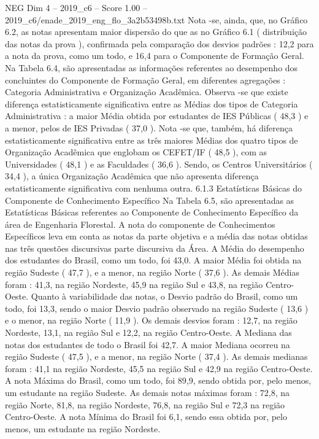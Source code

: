 \begin{textsample}{NEG Dim 4 – 2019\_c6 – Score 1.00 – 2019\_c6/enade\_2019\_eng\_flo\_3a2b53498b.txt}
Nota -se, ainda, que, no Gráfico 6.2, as notas apresentam maior dispersão do que as no Gráfico 6.1 ( distribuição das notas da prova ), confirmada pela comparação dos desvios padrões : 12,2 para a nota da prova, como um todo, e 16,4 para o Componente de Formação Geral.
Na Tabela 6.4, são apresentadas as informações referentes ao desempenho dos concluintes do Componente de Formação Geral, em diferentes agregações : Categoria Administrativa e Organização Acadêmica.
Observa -se que existe diferença estatisticamente significativa entre as Médias dos tipos de Categoria Administrativa : a maior Média obtida por estudantes de IES Públicas ( 48,3 ) e a menor, pelos de IES Privadas ( 37,0 ).
Nota -se que, também, há diferença estatisticamente significativa entre as três maiores Médias dos quatro tipos de Organização Acadêmica que englobam os CEFET/IF ( 48,5 ), com as Universidades ( 48,1 ) e as Faculdades ( 36,6 ).
Sendo, os Centros Universitários ( 34,4 ), a única Organização Acadêmica que não apresenta diferença estatisticamente significativa com nenhuma outra. 6.1.3 Estatísticas Básicas do Componente de Conhecimento Específico Na Tabela 6.5, são apresentadas as Estatísticas Básicas referentes ao Componente de Conhecimento Específico da área de Engenharia Florestal.
A nota do componente de Conhecimentos Específicos leva em conta as notas da parte objetiva e a média das notas obtidas nas três questões discursivas parte discursiva da Área.
A Média do desempenho dos estudantes do Brasil, como um todo, foi 43,0.
A maior Média foi obtida na região Sudeste ( 47,7 ), e a menor, na região Norte ( 37,6 ).
As demais Médias foram : 41,3, na região Nordeste, 45,9 na região Sul e 43,8, na região Centro-Oeste.
Quanto à variabilidade das notas, o Desvio padrão do Brasil, como um todo, foi 13,3, sendo o maior Desvio padrão observado na região Sudeste ( 13,6 ) e o menor, na região Norte ( 11,9 ).
Os demais desvios foram : 12,7, na região Nordeste, 13,1, na região Sul e 12,2, na região Centro-Oeste.
A Mediana das notas dos estudantes de todo o Brasil foi 42,7.
A maior Mediana ocorreu na região Sudeste ( 47,5 ), e a menor, na região Norte ( 37,4 ).
As demais medianas foram : 41,1 na região Nordeste, 45,5 na região Sul e 42,9 na região Centro-Oeste.
A nota Máxima do Brasil, como um todo, foi 89,9, sendo obtida por, pelo menos, um estudante na região Sudeste.
As demais notas máximas foram : 72,8, na região Norte, 81,8, na região Nordeste, 76,8, na região Sul e 72,3 na região Centro-Oeste.
A nota Mínima do Brasil foi 6,1, sendo essa obtida por, pelo menos, um estudante na região Nordeste.

\end{textsample}
